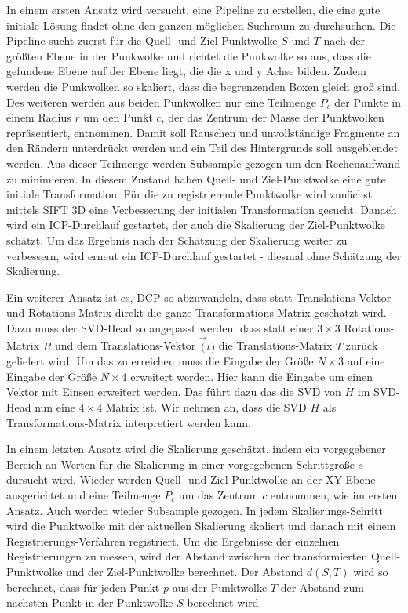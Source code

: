 \documentclass[12pt,titlepage, twoside]{article}
\begin{document}
In einem ersten Ansatz wird versucht, eine Pipeline zu erstellen, die eine gute initiale Lösung findet ohne den ganzen möglichen Suchraum zu durchsuchen.
Die Pipeline sucht zuerst für die Quell- und Ziel-Punktwolke $S$ und $T$ nach der größten Ebene in der Punkwolke und richtet die Punkwolke so aus, dass die gefundene Ebene auf der Ebene liegt, die die x und y Achse bilden.
Zudem werden die Punkwolken so skaliert, dass die begrenzenden Boxen gleich groß sind.
Des weiteren werden aus beiden Punkwolken nur eine Teilmenge $P_c$ der Punkte in einem Radius $r$ um den Punkt $c$, der das Zentrum der Masse der Punktwolken repräsentiert, entnommen.
Damit soll Rauschen und unvollständige Fragmente an den Rändern unterdrückt werden und ein Teil des Hintergrunds soll ausgeblendet werden.
Aus dieser Teilmenge werden Subsample gezogen um den Rechenaufwand zu minimieren. In diesem Zustand haben Quell- und Ziel-Punktwolke eine gute initiale Transformation.
Für die zu registrierende Punktwolke wird zunächst mittels SIFT 3D \cite{Sift3D} eine Verbesserung der initialen Transformation gesucht. 
Danach wird ein ICP-Durchlauf gestartet, der auch die Skalierung der Ziel-Punktwolke schätzt.
Um das Ergebnis nach der Schätzung der Skalierung weiter zu verbessern, wird erneut ein ICP-Durchlauf gestartet - diesmal ohne Schätzung der Skalierung.

Ein weiterer Ansatz ist es, DCP so abzuwandeln, dass statt Translations-Vektor und Rotations-Matrix direkt die ganze Transformations-Matrix geschätzt wird. 
Dazu muss der SVD-Head so angepasst werden, dass statt einer $3\times 3$ Rotations-Matrix $R$ und dem Translations-Vektor $\vec(t)$ die Translations-Matrix $T$ zurück geliefert wird.
Um das zu erreichen muss die Eingabe der Größe $N\times 3$ auf eine Eingabe der Größe $N\times 4$ erweitert werden. Hier kann die Eingabe um einen Vektor mit Einsen erweitert werden.
Das führt dazu das die SVD von $H$ im SVD-Head nun eine $4\times 4$ Matrix ist. Wir nehmen an, dass die SVD $H$ als Transformations-Matrix interpretiert werden kann.

In einem letzten Ansatz wird die Skalierung geschätzt, indem ein vorgegebener Bereich an Werten für die Skalierung in einer vorgegebenen Schrittgröße $s$ dursucht wird.
Wieder werden Quell- und Ziel-Punktwolke an der XY-Ebene ausgerichtet und eine Teilmenge $P_c$ um das Zentrum $c$ entnommen, wie im ersten Ansatz. Auch werden wieder Subsample gezogen.
In jedem Skalierungs-Schritt wird die Punktwolke mit der aktuellen Skalierung skaliert und danach mit einem Registrierungs-Verfahren registriert.
Um die Ergebnisse der einzelnen Registrierungen zu messen, wird der Abstand zwischen der transformierten Quell-Punktwolke und der Ziel-Punktwolke berechnet. 
Der Abstand $d(S,T)$ wird so berechnet, dass für jeden Punkt $p$ aus der Punktwolke $T$ der Abstand zum nächsten Punkt in der Punktwolke $S$ berechnet wird.
\end{document}
